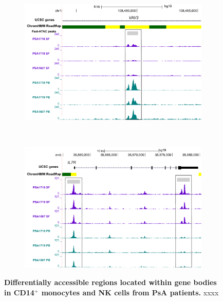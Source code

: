 \bigskip
\begin{figure}[H]
\centering
\begin{subfigure}[b]{0.70\textwidth}
\centering 
\includegraphics[width=\textwidth]{./Results3/pdfs/ATAC_PSA_NK_VAV3}
\caption{}
\end{subfigure}
~
\begin{subfigure}[b]{0.70\textwidth} 
\centering
\includegraphics[width=\textwidth]{./Results3/pdfs/ATAC_PSA_CD14_IL7R}
\caption{}
\end{subfigure}
\caption[Differentially accessible regions located within gene bodies in CD14$^+$ monocytes and NK cells from PsA patients.]{\textbf{Differentially accessible regions located within gene bodies in CD14$^+$ monocytes and NK cells from PsA patients.} xxxx}
\label{figure:PsA_FAST_ATAC_gene_boy_DOCS_CD14_NK}
\end{figure}

